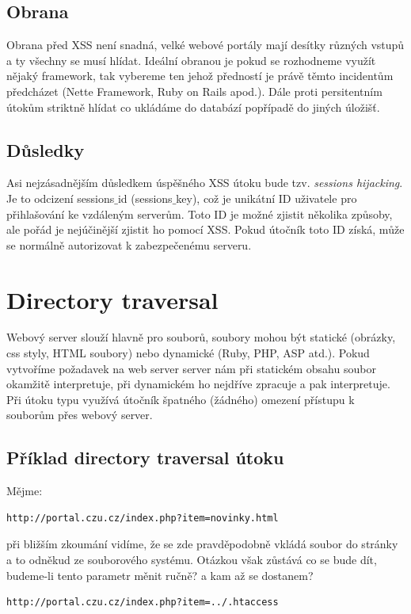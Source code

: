 \documentclass[12pt, a4paper]{report}
\begin{document}
\subsection{Obrana}
Obrana před XSS není snadná, velké webové portály mají desítky různých vstupů a ty všechny se musí hlídat. Ideální obranou je pokud se rozhodneme využít nějaký framework, tak vybereme ten jehož předností je právě těmto incidentům předcházet (Nette Framework, Ruby on Rails apod.). Dále proti persitentním útokům striktně hlídat co ukládáme do databází popřípadě do jiných úložišť.

\subsection{Důsledky}
Asi nejzásadnějším důsledkem úspěšného XSS útoku bude tzv. \textit{sessions hijacking}. Je to odcizení sessions$\_$id (sessions$\_$key), což je unikátní ID uživatele pro přihlašování ke vzdáleným serverům. Toto ID je možné zjistit několika způsoby, ale pořád je nejúčinější zjistit ho pomocí XSS. Pokud útočník toto ID získá, může se normálně autorizovat k zabezpečenému serveru.

\section{Directory traversal}
Webový server slouží hlavně pro  souborů, soubory mohou být statické (obrázky, css styly, HTML soubory) nebo dynamické (Ruby, PHP, ASP atd.). Pokud vytvoříme požadavek na web server server nám při statickém obsahu soubor okamžitě interpretuje, při dynamickém ho nejdříve zpracuje a pak interpretuje. Při útoku typu  využívá útočník špatného (žádného) omezení přístupu k souborům přes webový server.

\subsection{Příklad directory traversal útoku}
Mějme:
\begin{lstlisting}[label=some-code,caption=URL adresa s podezdřením na include souboru]
http://portal.czu.cz/index.php?item=novinky.html
\end{lstlisting}
při bližším zkoumání vidíme, že se zde pravděpodobně vkládá soubor  do stránky a to odněkud ze souborového systému. Otázkou však zůstává co se bude dít, budeme-li tento parametr měnit ručně? a kam až se dostanem?

\begin{lstlisting}[label=man_url_get_htaccess,caption=Manipulace s URL - získání .htaccess]
http://portal.czu.cz/index.php?item=../.htaccess
\end{lstlisting}
\end{document}
